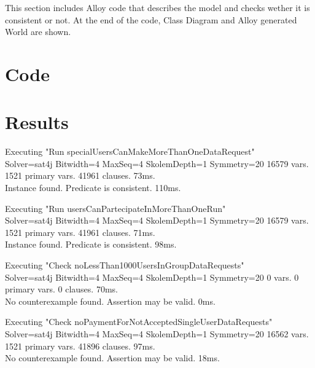 This section includes Alloy code that describes the model and checks wether it is consistent or not.
At the end of the code, Class Diagram and Alloy generated World are shown.

\section{Code}


\vfill

\section{Results}

   Executing "Run specialUsersCanMakeMoreThanOneDataRequest" \\ \noindent
      Solver=sat4j Bitwidth=4 MaxSeq=4 SkolemDepth=1 Symmetry=20
      16579 vars. 1521 primary vars. 41961 clauses. 73ms. \\ \noindent
      Instance found. Predicate is consistent. 110ms.

   \vspace{1cm}

   Executing "Run usersCanPartecipateInMoreThanOneRun" \\ \noindent
      Solver=sat4j Bitwidth=4 MaxSeq=4 SkolemDepth=1 Symmetry=20
      16579 vars. 1521 primary vars. 41961 clauses. 71ms. \\ \noindent
      Instance found. Predicate is consistent. 98ms.

   \vspace{1cm}

   Executing "Check noLessThan1000UsersInGroupDataRequests" \\ \noindent
      Solver=sat4j Bitwidth=4 MaxSeq=4 SkolemDepth=1 Symmetry=20
      0 vars. 0 primary vars. 0 clauses. 70ms. \\ \noindent
      No counterexample found. Assertion may be valid. 0ms.

   \vspace{1cm}

   Executing "Check noPaymentForNotAcceptedSingleUserDataRequests" \\ \noindent
      Solver=sat4j Bitwidth=4 MaxSeq=4 SkolemDepth=1 Symmetry=20
      16562 vars. 1521 primary vars. 41896 clauses. 97ms. \\ \noindent
      No counterexample found. Assertion may be valid. 18ms.

